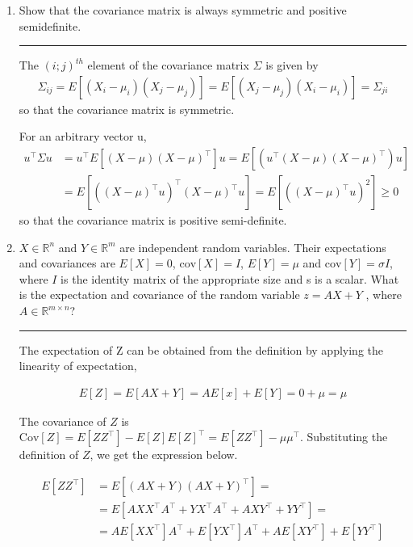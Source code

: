 \documentclass[12pt]{article}
\begin{document}
\begin{enumerate}
    \item Show that the covariance matrix is always symmetric and positive semidefinite.
     
    \noindent\rule{\linewidth}{1pt}
    The $(i; j)^{th}$ element of the covariance matrix $\Sigma$ is given by
    \begin{align*}
        \Sigma_{ij} = E[(X_i - \mu_i)(X_j - \mu_j )] = E[(X_j - \mu_j)(X_i - \mu_i)] = \Sigma_{ji}
    \end{align*}
    so that the covariance matrix is symmetric.

    For an arbitrary vector u,
    \begin{align*}
        u^\intercal \Sigma u &= u^\intercal E[(X-\mu)(X-\mu)^\intercal]u = E[(u^\intercal (X - \mu)(X - \mu)^\intercal) u] \\
        &= E[((X - \mu)^\intercal u)^\intercal (X-\mu)^\intercal u] = E[((X-\mu)^\intercal u)^2] \geq 0
    \end{align*}
    so that the covariance matrix is positive semi-definite.

    \item $X \in \mathbb{R}^n$ and $Y \in \mathbb{R}^m$ are independent random variables. Their expectations and covariances are $E[X]=0$, $\textrm{cov}[X] = I$, $E[Y] = \mu$ and $\textrm{cov}[Y] = \sigma I$, 
        where $I$ is the identity matrix of the appropriate size and s is a scalar. What is the expectation and covariance of the random variable $z = AX + Y$ , where $A \in \mathbb{R}^{m \times n}$? 
    
    \noindent\rule{\linewidth}{1pt}

    The expectation of Z can be obtained from the definition by applying the linearity of expectation,

    \begin{align*}
        E[Z] = E[AX+Y] = AE[x]+E[Y] = 0 +\mu = \mu
    \end{align*}

    The covariance of $Z$ is $\textrm{Cov}[Z] = E[ZZ^\intercal] - E[Z]E[Z]^\intercal = E[ZZ^\intercal] - \mu \mu^\intercal $. Substituting the definition of $Z$, we get the expression below.

    \begin{align*}
        E[ZZ^\intercal ] &= E[(AX + Y )(AX + Y )^\intercal ] = \\ 
               &= E[AXX^\intercal A^\intercal  + Y X^\intercal A^\intercal  + AXY^\intercal  + Y Y^\intercal ] = \\
               &= AE[XX^\intercal ]A^\intercal  + E[Y X^\intercal ]A^\intercal  + AE[XY^\intercal ] + E[Y Y^\intercal ] \\
    \end{align*}


\end{enumerate}
\end{document}
